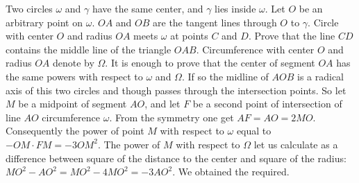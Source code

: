 \problem
Two circles $\omega$ and $\gamma$ have the same center, and $\gamma$ lies
inside $\omega$.
Let $O$ be an arbitrary point on $\omega$.
$OA$ and $OB$ are the tangent lines through $O$ to $\gamma$.
Circle with center $O$ and radius $OA$ meets $\omega$ at points $C$ and $D$.
Prove that the line $CD$ contains the middle line of the triangle $OAB$.
\solution
Circumference with center $O$ and radius $OA$ denote by $\Omega$. It is enough to prove that the center of segment $OA$ has the same powers with respect to $\omega$ and $\Omega$. If so the midline of $AOB$ is a radical axis of this two circles and though passes through the intersection points. So let $M$ be a midpoint of segment $AO$, and let $F$ be a second point of intersection of line $AO$ circumference $\omega$. From the symmetry one get $AF=AO=2MO$. Consequently the power of point $M$ with respect to $\omega$ equal to $-OM\cdot FM=-3OM^2$. The power of $M$ with respect to $\Omega$ let us calculate as a difference between square of the distance to the center and square of the radius: $MO^2-AO^2=MO^2-4MO^2=-3AO^2$. We obtained the required.
\endproblem
